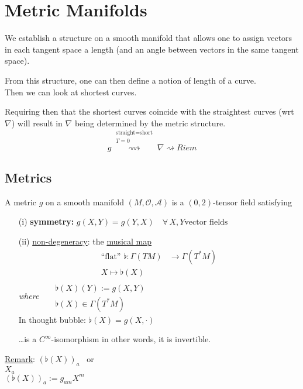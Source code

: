 \section{Metric Manifolds}
We establish a structure on a smooth manifold that allows one to assign vectors in each tangent space a length (and an angle between vectors in the same tangent space).

From this structure, one can then define a notion of length of a curve. \\
Then we can look at shortest curves.

Requiring then that the shortest curves coincide with the straightest curves (wrt $\nabla$) will result in $\nabla$ being determined by the metric structure.  
\[
g  \overset{\substack{\text{straight} = \text{short} \\ T =0 }}{\rightsquigarrow}  \nabla \rightsquigarrow Riem
\]

\subsection{Metrics}
\begin{definition}
  A metric $g$ on a smooth manifold $(M,\mathcal{O}, \mathcal{A})$ is a $(0,2)$-tensor field satisfying
\begin{enumerate}
\item[(i)] \textbf{symmetry:} $g(X,Y) = g(Y,X) \quad \forall \, X, Y \text{vector fields}$
\item[(ii)] \underline{non-degeneracy}: the \underline{musical map}
\[
\begin{aligned}
  \text{``flat''} \, \,  \flat : \Gamma(TM) & \to \Gamma(T^*M) \\ 
  X \mapsto \flat(X)
\end{aligned}
\]
\emph{where} \quad \,  $\begin{aligned} & \quad \quad \\ 
  & \flat(X)(Y):= g(X,Y) \\
  & \flat(X) \in \Gamma(T^*M) \end{aligned}$ \\
In thought bubble: $\flat(X) = g(X,\cdot)$

\dots is a $C^{\infty}$-isomorphism in other words, it is invertible.
\end{enumerate}
\end{definition}

\underline{Remark}: $(\flat(X))_a$ \quad \, or \\
$X_a$ \\
$(\flat(X))_a := g_{am} X^m$

